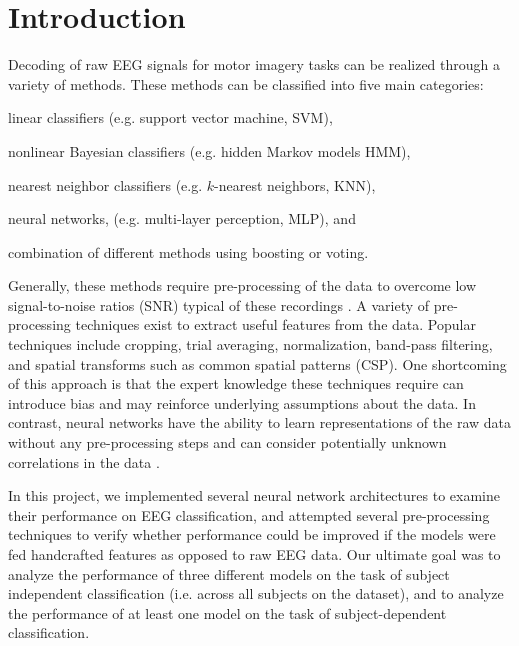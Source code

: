 \documentclass[10pt,twocolumn,letterpaper]{article}
\begin{document}
\section{Introduction}
Decoding of raw EEG signals for motor imagery tasks can be realized through a
variety of methods. These methods can be classified into five main categories:
\begin{enumerate*}
    \item linear classifiers (e.g. support vector machine, SVM),
    \item nonlinear Bayesian classifiers (e.g. hidden Markov models HMM),
    \item nearest neighbor classifiers (e.g. $k$-nearest neighbors, KNN),
    \item neural networks, (e.g. multi-layer perception, MLP), and
    \item combination of different methods using boosting or voting.
\end{enumerate*} \cite{wang}

Generally, these methods require pre-processing of the data to overcome low
signal-to-noise ratios (SNR) typical of these recordings
\cite{kostas2019machine}.
A variety of pre-processing techniques exist to extract useful features from the
data. Popular techniques include cropping, trial averaging, normalization,
band-pass filtering, and spatial transforms such as common spatial patterns
(CSP). One shortcoming of this approach is that the expert knowledge these
techniques require can introduce bias and may reinforce underlying assumptions
about the data.
In contrast, neural networks have the ability to learn representations of the
raw data without any pre-processing steps and can consider potentially unknown
correlations in the data \cite{kostas2019machine}.

In this project, we implemented several neural network architectures to examine
their performance on EEG classification, and attempted several pre-processing
techniques to verify whether performance could be improved if the models were
fed handcrafted features as opposed to raw EEG data.
Our ultimate goal was to analyze the performance of three different models on
the task of subject independent classification (i.e. across all subjects on the
dataset), and to analyze the performance of at least one model on the task of
subject-dependent classification. 
\end{document}
